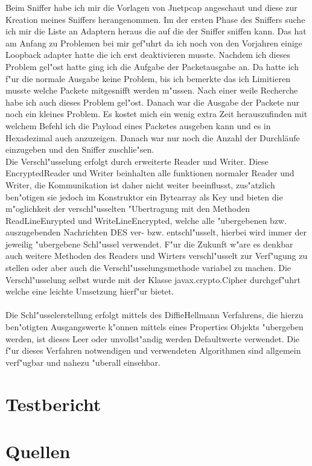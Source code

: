 \documentclass[a4paper,12pt]{scrreprt}
\begin{document}
Beim Sniffer habe ich mir die Vorlagen von Jnetpcap angeschaut und diese zur Kreation meines Sniffers herangenommen.
Im der ersten Phase des Sniffers suche ich mir die Liste an Adaptern heraus die auf die der Sniffer sniffen kann.
Das hat am Anfang zu Problemen bei mir gef"uhrt da ich noch von den Vorjahren einige Loopback adapter hatte die ich erst deaktivieren musste. Nachdem ich dieses Problem gel"ost hatte ging ich die Aufgabe der Packetausgabe an. Da hatte ich f"ur die normale Ausgabe keine Problem, bis ich bemerkte das ich Limitieren musste welche Packete mitgesnifft werden m"ussen. Nach einer weile Recherche habe ich auch dieses Problem gel"ost. Danach war die Ausgabe der Packete nur noch ein kleines Problem. Es kostet mich ein wenig extra Zeit herauszufinden mit welchem Befehl ich die Payload eines Packetes ausgeben kann und es in Hexadezimal auch anzuzeigen. Danach war nur noch die Anzahl der Durchläufe einzugeben und den Sniffer zuschlie"sen. 
\\Die Verschl"usselung erfolgt durch erweiterte Reader und Writer. Diese EncryptedReader und Writer beinhalten alle funktionen normaler Reader und Writer, die Kommunikation ist daher nicht weiter beeinflusst, zus"atzlich ben"otigen sie jedoch im Konstruktor ein Bytearray als Key und bieten die m"oglichkeit der verschl"usselten "Ubertragung mit den Methoden ReadLineEnrypted und WriteLineEncrypted, welche alle "ubergebenen bzw. auszugebenden Nachrichten DES ver- bzw. entschl"usselt, hierbei wird immer der jeweilig "ubergebene Schl"ussel verwendet. F"ur die Zukunft w"are es denkbar auch weitere Methoden des Readers und Wirters verschl"usselt zur Verf"ugung zu stellen oder aber auch die Verschl"usselungsmethode variabel zu machen. Die Verschl"usselung selbst wurde mit der Klasse javax.crypto.Cipher durchgef"uhrt welche eine leichte Umsetzung hierf"ur bietet.\\
\\Die Schl"usselerstellung erfolgt mittels des DiffieHellmann Verfahrens, die hierzu ben"otigten Ausgangswerte k"onnen mittels eines Properties Objekts "ubergeben werden, ist dieses Leer oder unvollst"andig werden Defaultwerte verwendet. Die f"ur dieses Verfahren notwendigen und verwendeten Algorithmen sind allgemein verf"ugbar und nahezu "uberall einsehbar.
\chapter{Testbericht}
\chapter{Quellen}
\end{document}
